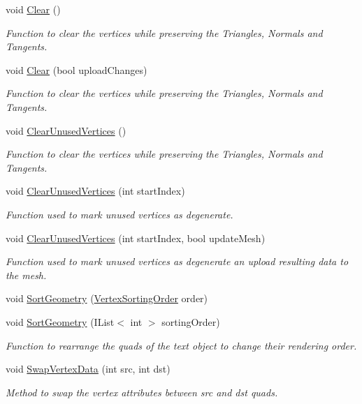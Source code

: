 \begin{DoxyCompactItemize}
void \mbox{\hyperlink{struct_t_m_pro_1_1_t_m_p___mesh_info_add2e199157007db54ca91226a7d8a3dc}{Clear}} ()
\begin{DoxyCompactList}\small\item\em Function to clear the vertices while preserving the Triangles, Normals and Tangents. \end{DoxyCompactList}\item 
void \mbox{\hyperlink{struct_t_m_pro_1_1_t_m_p___mesh_info_ad1fe51b4a54d9707e40400ebcfae7dea}{Clear}} (bool upload\+Changes)
\begin{DoxyCompactList}\small\item\em Function to clear the vertices while preserving the Triangles, Normals and Tangents. \end{DoxyCompactList}\item 
void \mbox{\hyperlink{struct_t_m_pro_1_1_t_m_p___mesh_info_a7abd732cdaf4d54113166700701defd4}{Clear\+Unused\+Vertices}} ()
\begin{DoxyCompactList}\small\item\em Function to clear the vertices while preserving the Triangles, Normals and Tangents. \end{DoxyCompactList}\item 
void \mbox{\hyperlink{struct_t_m_pro_1_1_t_m_p___mesh_info_ad2667025b52d22291cc6c57fd5a95126}{Clear\+Unused\+Vertices}} (int start\+Index)
\begin{DoxyCompactList}\small\item\em Function used to mark unused vertices as degenerate. \end{DoxyCompactList}\item 
void \mbox{\hyperlink{struct_t_m_pro_1_1_t_m_p___mesh_info_aba0fe3e04e63be7438407d54d7e1c1e8}{Clear\+Unused\+Vertices}} (int start\+Index, bool update\+Mesh)
\begin{DoxyCompactList}\small\item\em Function used to mark unused vertices as degenerate an upload resulting data to the mesh. \end{DoxyCompactList}\item 
void \mbox{\hyperlink{struct_t_m_pro_1_1_t_m_p___mesh_info_a2514314a12727c88ad96da1fc2dcbfab}{Sort\+Geometry}} (\mbox{\hyperlink{namespace_t_m_pro_a29c2b2e41c29850d1bc0760ac64b1ee0}{Vertex\+Sorting\+Order}} order)
\item 
void \mbox{\hyperlink{struct_t_m_pro_1_1_t_m_p___mesh_info_af12a00628b4e8a24470a6f4656fee685}{Sort\+Geometry}} (I\+List$<$ int $>$ sorting\+Order)
\begin{DoxyCompactList}\small\item\em Function to rearrange the quads of the text object to change their rendering order. \end{DoxyCompactList}\item 
void \mbox{\hyperlink{struct_t_m_pro_1_1_t_m_p___mesh_info_aea0d76fdcacdb531d31b168575444c2a}{Swap\+Vertex\+Data}} (int src, int dst)
\begin{DoxyCompactList}\small\item\em Method to swap the vertex attributes between src and dst quads. \end{DoxyCompactList}\end{DoxyCompactItemize}
